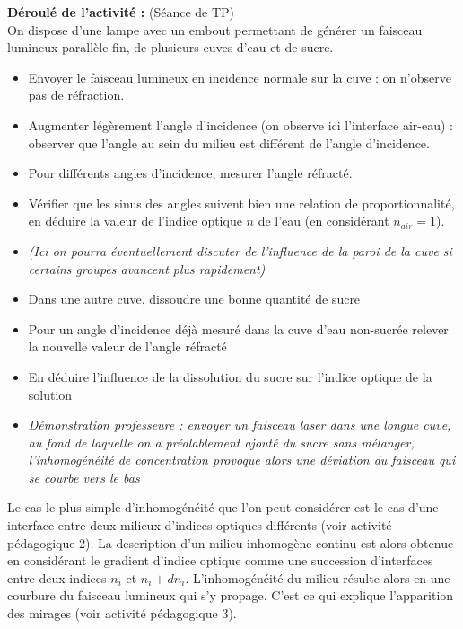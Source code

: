 \documentclass[a4paper,11pt]{article} %
\newcommand{\pointmedian}{{\fontfamily{cmr}\selectfont\textperiodcentered}}
\newenvironment{encart}[1]{%
	\begin{tcolorbox}
		[
		breakable, enhanced jigsaw, %
		arc = 1mm, %
		title = \textbf{#1}, %
		coltitle = white, %
		colbacktitle = blue, %
		colback = white, %
		colframe = blue %
		]
}{		
	\end{tcolorbox}
	\vspace*{0.35cm}
}
\begin{document}
\begin{encart}{Activité pédagogique 2 : Phénomène de réfraction -- Loi de Snell--Descartes}
		\textbf{Déroulé de l'activité :} (Séance de TP)\\
		On dispose d'une lampe avec un embout permettant de générer un faisceau lumineux parallèle fin, de plusieurs cuves d'eau et de sucre.
		\begin{itemize}
			\item Envoyer le faisceau lumineux en incidence normale sur la cuve : on n'observe pas de réfraction.
			\item Augmenter légèrement l'angle d'incidence (on observe ici l'interface air-eau) : observer que l'angle au sein du milieu est différent de l'angle d'incidence.
			\item Pour différents angles d'incidence, mesurer l'angle réfracté.
			\item Vérifier que les sinus des angles suivent bien une relation de proportionnalité, en déduire la valeur de l'indice optique $ n $ de l'eau (en considérant $ n_{air} = 1 $).
			\item \textit{(Ici on pourra éventuellement discuter de l'influence de la paroi de la cuve si certains groupes avancent plus rapidement)}
			\item Dans une autre cuve, dissoudre une bonne quantité de sucre
			\item Pour un angle d'incidence déjà mesuré dans la cuve d'eau non-sucrée relever la nouvelle valeur de l'angle réfracté
			\item En déduire l'influence de la dissolution du sucre sur l'indice optique de la solution
			\item \textit{Démonstration professeur\pointmedian e : envoyer un faisceau laser dans une longue cuve, au fond de laquelle on a préalablement ajouté du sucre sans mélanger, l'inhomogénéité de concentration provoque alors une déviation du faisceau qui se courbe vers le bas} 
		\end{itemize}
		
	\end{encart}
	

	Le cas le plus simple d'inhomogénéité que l'on peut considérer est le cas d'une interface entre deux milieux d'indices optiques différents (voir activité pédagogique 2). La description d'un milieu inhomogène continu est alors obtenue en considérant le gradient d'indice optique comme une succession d'interfaces entre deux indices $ n_i $ et $ n_i + dn_i $. L'inhomogénéité du milieu résulte alors en une courbure du faisceau lumineux qui s'y propage. C'est ce qui explique l'apparition des mirages (voir activité pédagogique 3).\\
	
\end{document}
